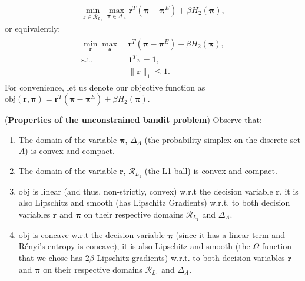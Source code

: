 \begin{equation}
    \label{eq:minmaxBanditIRLexplicit}
    \begin{aligned}
        \min_{\bm{r}\in\mathcal{R}_{L_1}}\max_{\bm{\pi}\in\Delta_{A}} \bm{r}^T(\bm{\pi}-\bm{\pi}^E) + \beta H_2(\bm{\pi}),
    \end{aligned}
\end{equation}
or equivalently:
\begin{align*}
    \begin{aligned}
        \min_{\bm{r}} \max_{\bm{\pi}} ~ & \bm{r}^T(\bm{\pi}-\bm{\pi}^E) + \beta H_2(\bm{\pi}), \\
        \text{s.t. }& \bm{1}^T \pi = 1, \\
         & \| \bm{r} \|_1 \leq 1.
    \end{aligned}
\end{align*}
For convenience, let us denote our objective function as $\text{obj}(\bm{r},\bm{\pi}) = \bm{r}^T(\bm{\pi}-\bm{\pi}^E) + \beta H_2(\bm{\pi})$. 
\begin{observation}
    \label{obs:properties_unconstrained_inverse_bandit}
    (\textbf{Properties of the unconstrained bandit problem}) Observe that:
    \begin{enumerate}
        \item The domain of the variable $\bm{\pi}$, $\Delta_A$ (the probability simplex on the discrete set $A$) is convex and compact.
        \item The domain of the variable $\bm{r}$, $\mathcal{R}_{L_1}$ (the L1 ball) is convex and compact.
        \item $\text{obj}$ is {linear} (and thus, non-strictly, convex) w.r.t the decision variable $\bm{r}$, it is also Lipschitz and smooth (has  Lipschitz Gradients) w.r.t. to both decision variables  $\bm{r}$ and $\bm{\pi}$ on their respective domains $\mathcal{R}_{L_1}$ and $\Delta_A$.
        \item $\text{obj}$ is concave w.r.t the decision variable $\bm{\pi}$ (since it has a linear term and Rényi's entropy is concave), it is also Lipschitz and smooth (the $\Omega$ function that we chose has $2\beta$-Lipschitz gradients) w.r.t. to both decision variables  $\bm{r}$ and $\bm{\pi}$ on their respective domains $\mathcal{R}_{L_1}$ and $\Delta_A$.
    \end{enumerate}
\end{observation}

